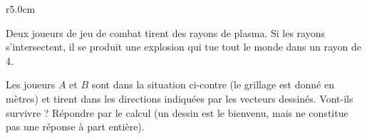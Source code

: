 
\begin{exercice}\label{exosmath-0411}

\begin{wrapfigure}{r}{5.0cm}
            \vspace{-0.5cm}        %
                \centering
                    
                \end{wrapfigure}

    Deux joueurs de jeu de combat tirent des rayons de plasma. Si les rayons s'intersectent, il se produit une explosion qui tue tout le monde dans un rayon de \unit{4}{\meter}. 

    Les joueurs \( A\) et \( B\) sont dans la situation ci-contre (le grillage est donné en mètres) et tirent dans les directions indiquées par les vecteurs dessinés. Vont-ils survivre ? Répondre par le calcul (un dessin est le bienvenu, mais ne constitue pas une réponse à part entière). 

\end{exercice}
